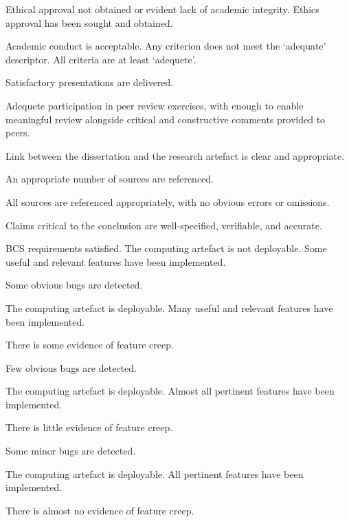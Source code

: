 \begin{markingrubric}
%
		\grade\fail Ethical approval not obtained or evident lack of academic integrity.
		\grade Ethics approval has been sought and obtained. \par Academic conduct is acceptable.
%
		\grade\fail Any criterion does not meet the `adequate' descriptor.
		\grade All criteria are at least `adequete'.
                       \par Satisfactory presentations are delivered.
		  \par Adequete participation in peer review exercises, with enough to enable meaningful review alongside critical and constructive comments provided to peers.
		  \par Link between the dissertation and the research artefact is clear and appropriate.
		  \par An appropriate number of sources are referenced.
		  \par All sources are referenced appropriately, with no obvious errors or omissions.
		  \par Claims critical to the conclusion are well-specified, verifiable, and accurate.
		  \par BCS requirements satisfied.
%
        \grade \fail The computing artefact is not deployable.
        \grade Some useful and relevant features have been implemented.
            \par Some obvious bugs are detected.
            \par The computing artefact is deployable.
        \grade Many useful and relevant features have been implemented.
            \par There is some evidence of feature creep.
            \par Few obvious bugs  are detected.
            \par The computing artefact is deployable.
        \grade Almost all pertinent features have been implemented.
            \par There is little evidence of feature creep.
            \par Some minor bugs  are detected.
            \par The computing artefact is deployable.
        \grade All pertinent features have been implemented.
            \par There is almost no evidence of feature creep.

\end{markingrubric}
